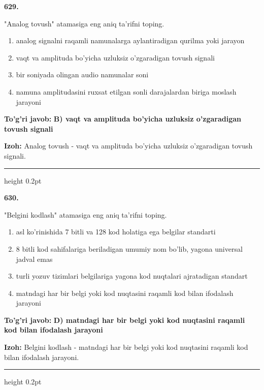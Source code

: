 \documentclass[10pt,a4paper,oneside]{article}
\begin{document}
\noindent\textbf{\color{ink}629.}
\par
"Analog tovush" atamasiga eng aniq ta'rifni toping.
\begin{enumerate}[label=\Alph*),leftmargin=9mm]
\item analog signalni raqamli namunalarga aylantiradigan qurilma yoki jarayon
\item vaqt va amplituda bo'yicha uzluksiz o'zgaradigan tovush signali
\item bir soniyada olingan audio namunalar soni
\item namuna amplitudasini ruxsat etilgan sonli darajalardan biriga moslash jarayoni
\end{enumerate}
\begin{tcolorbox}[enhanced,breakable,colback=teal!4,colframe=teal!50!black,boxrule=0.5pt,arc=1.1mm,left=3mm,right=3mm,top=1.7mm,bottom=1.7mm,before skip=2mm,after skip=2mm]
\textbf{\color{teal}To'g'ri javob:} \textbf{B) vaqt va amplituda bo'yicha uzluksiz o'zgaradigan tovush signali}
\par\smallskip
\textbf{Izoh:} Analog tovush - vaqt va amplituda bo'yicha uzluksiz o'zgaradigan tovush signali.
\end{tcolorbox}
\vspace{2mm}\hrule height 0.2pt \vspace{3mm}

\noindent\textbf{\color{ink}630.}
\par
"Belgini kodlash" atamasiga eng aniq ta'rifni toping.
\begin{enumerate}[label=\Alph*),leftmargin=9mm]
\item asl ko'rinishida 7 bitli va 128 kod holatiga ega belgilar standarti
\item 8 bitli kod sahifalariga beriladigan umumiy nom bo'lib, yagona universal jadval emas
\item turli yozuv tizimlari belgilariga yagona kod nuqtalari ajratadigan standart
\item matndagi har bir belgi yoki kod nuqtasini raqamli kod bilan ifodalash jarayoni
\end{enumerate}
\begin{tcolorbox}[enhanced,breakable,colback=teal!4,colframe=teal!50!black,boxrule=0.5pt,arc=1.1mm,left=3mm,right=3mm,top=1.7mm,bottom=1.7mm,before skip=2mm,after skip=2mm]
\textbf{\color{teal}To'g'ri javob:} \textbf{D) matndagi har bir belgi yoki kod nuqtasini raqamli kod bilan ifodalash jarayoni}
\par\smallskip
\textbf{Izoh:} Belgini kodlash - matndagi har bir belgi yoki kod nuqtasini raqamli kod bilan ifodalash jarayoni.
\end{tcolorbox}
\vspace{2mm}\hrule height 0.2pt \vspace{3mm}
\end{document}
